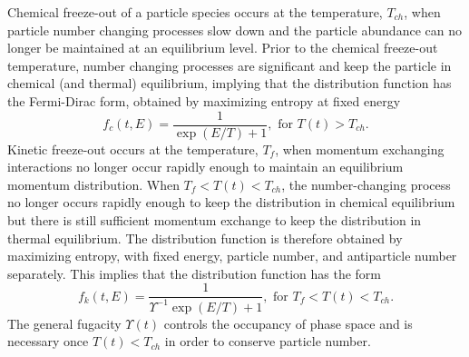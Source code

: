 \documentclass[universe,article,submit,moreauthors,pdftex,a4paper]{Definitions/mdpi}
\begin{document}
Chemical freeze-out of a particle species occurs at the temperature, 
$T_{ch}$, when particle number changing processes slow down and the particle abundance can no longer be maintained at an equilibrium level. Prior to the chemical freeze-out temperature, number changing processes are significant and keep the particle in chemical (and thermal) equilibrium, implying that the distribution function has the Fermi-Dirac form, obtained by maximizing entropy at fixed energy
\begin{equation}\label{equilibrium}
f_{c}(t,E)=\frac{1}{\exp(E/T)+1}, \text{ for } T(t)> T_{ch}.
\end{equation}
Kinetic freeze-out occurs at the temperature, $T_f$, when momentum exchanging interactions no longer occur rapidly enough to maintain an equilibrium momentum distribution. When $T_f<T(t)<T_{ch}$, the number-changing process no longer occurs rapidly enough to keep the distribution in chemical equilibrium but there is still sufficient momentum exchange to keep the distribution in thermal equilibrium. The distribution function is therefore obtained by maximizing entropy, with fixed energy, particle number, and antiparticle number separately. This implies that the distribution function has the form
\begin{equation}\label{kinetic_equilib}
f_k(t,E)=\frac{1}{\Upsilon^{-1}\exp(E/T)+1}, \text{ for }T_f< T(t)< T_{ch}.
\end{equation}
The general fugacity $\Upsilon(t)$ controls the occupancy of phase space and is necessary once $T(t)<T_{ch}$ in order to conserve particle number.
 
\end{document}
